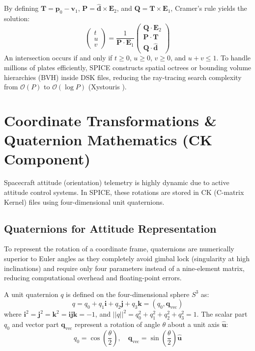 \documentclass{acta}
\begin{document}
By defining $\mathbf{T} = \mathbf{p}_0 - \mathbf{v}_1$, $\mathbf{P} = \mathbf{\hat{d}} \times \mathbf{E}_2$, and $\mathbf{Q} = \mathbf{T} \times \mathbf{E}_1$, Cramer's rule yields the solution:
\begin{equation}
\begin{pmatrix} t \\ u \\ v \end{pmatrix} = \frac{1}{\mathbf{P} \cdot \mathbf{E}_1} \begin{pmatrix} \mathbf{Q} \cdot \mathbf{E}_2 \\ \mathbf{P} \cdot \mathbf{T} \\ \mathbf{Q} \cdot \mathbf{\hat{d}} \end{pmatrix}
\end{equation}
An intersection occurs if and only if $t \ge 0$, $u \ge 0$, $v \ge 0$, and $u + v \le 1$. To handle millions of plates efficiently, SPICE constructs spatial octrees or bounding volume hierarchies (BVH) inside DSK files, reducing the ray-tracing search complexity from $\mathcal{O}(P)$ to $\mathcal{O}(\log P)$ (Xystouris ).

\section{Coordinate Transformations \& Quaternion Mathematics (CK Component)}
Spacecraft attitude (orientation) telemetry is highly dynamic due to active attitude control systems. In SPICE, these rotations are stored in CK (C-matrix Kernel) files using four-dimensional unit quaternions.

\subsection{Quaternions for Attitude Representation}
To represent the rotation of a coordinate frame, quaternions are numerically superior to Euler angles as they completely avoid gimbal lock (singularity at high inclinations) and require only four parameters instead of a nine-element matrix, reducing computational overhead and floating-point errors.

A unit quaternion $q$ is defined on the four-dimensional sphere $S^3$ as:
\begin{equation}
q = q_0 + q_1 \mathbf{i} + q_2 \mathbf{j} + q_3 \mathbf{k} = (q_0, \mathbf{q}_{\text{vec}})
\end{equation}
where $\mathbf{i}^2 = \mathbf{j}^2 = \mathbf{k}^2 = \mathbf{i}\mathbf{j}\mathbf{k} = -1$, and $||q||^2 = q_0^2 + q_1^2 + q_2^2 + q_3^2 = 1$. The scalar part $q_0$ and vector part $\mathbf{q}_{\text{vec}}$ represent a rotation of angle $\theta$ about a unit axis $\mathbf{\hat{u}}$:
\begin{equation}
q_0 = \cos\left(\frac{\theta}{2}\right), \quad \mathbf{q}_{\text{vec}} = \sin\left(\frac{\theta}{2}\right) \mathbf{\hat{u}}
\end{equation}
\end{document}
